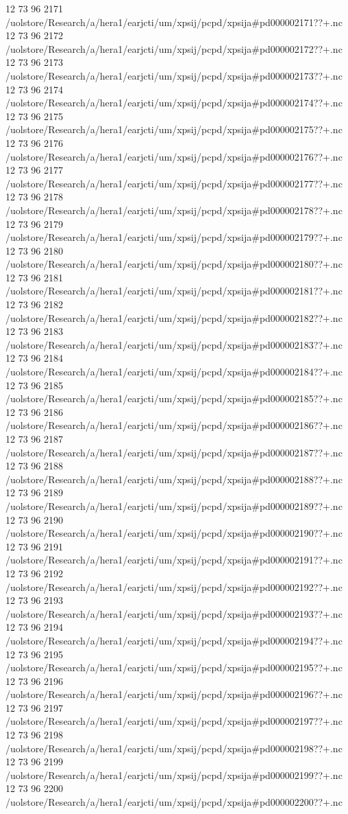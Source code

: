 12 73 96
2171
/uolstore/Research/a/hera1/earjcti/um/xpsij/pcpd/xpsija#pd000002171??+.nc
12 73 96
2172
/uolstore/Research/a/hera1/earjcti/um/xpsij/pcpd/xpsija#pd000002172??+.nc
12 73 96
2173
/uolstore/Research/a/hera1/earjcti/um/xpsij/pcpd/xpsija#pd000002173??+.nc
12 73 96
2174
/uolstore/Research/a/hera1/earjcti/um/xpsij/pcpd/xpsija#pd000002174??+.nc
12 73 96
2175
/uolstore/Research/a/hera1/earjcti/um/xpsij/pcpd/xpsija#pd000002175??+.nc
12 73 96
2176
/uolstore/Research/a/hera1/earjcti/um/xpsij/pcpd/xpsija#pd000002176??+.nc
12 73 96
2177
/uolstore/Research/a/hera1/earjcti/um/xpsij/pcpd/xpsija#pd000002177??+.nc
12 73 96
2178
/uolstore/Research/a/hera1/earjcti/um/xpsij/pcpd/xpsija#pd000002178??+.nc
12 73 96
2179
/uolstore/Research/a/hera1/earjcti/um/xpsij/pcpd/xpsija#pd000002179??+.nc
12 73 96
2180
/uolstore/Research/a/hera1/earjcti/um/xpsij/pcpd/xpsija#pd000002180??+.nc
12 73 96
2181
/uolstore/Research/a/hera1/earjcti/um/xpsij/pcpd/xpsija#pd000002181??+.nc
12 73 96
2182
/uolstore/Research/a/hera1/earjcti/um/xpsij/pcpd/xpsija#pd000002182??+.nc
12 73 96
2183
/uolstore/Research/a/hera1/earjcti/um/xpsij/pcpd/xpsija#pd000002183??+.nc
12 73 96
2184
/uolstore/Research/a/hera1/earjcti/um/xpsij/pcpd/xpsija#pd000002184??+.nc
12 73 96
2185
/uolstore/Research/a/hera1/earjcti/um/xpsij/pcpd/xpsija#pd000002185??+.nc
12 73 96
2186
/uolstore/Research/a/hera1/earjcti/um/xpsij/pcpd/xpsija#pd000002186??+.nc
12 73 96
2187
/uolstore/Research/a/hera1/earjcti/um/xpsij/pcpd/xpsija#pd000002187??+.nc
12 73 96
2188
/uolstore/Research/a/hera1/earjcti/um/xpsij/pcpd/xpsija#pd000002188??+.nc
12 73 96
2189
/uolstore/Research/a/hera1/earjcti/um/xpsij/pcpd/xpsija#pd000002189??+.nc
12 73 96
2190
/uolstore/Research/a/hera1/earjcti/um/xpsij/pcpd/xpsija#pd000002190??+.nc
12 73 96
2191
/uolstore/Research/a/hera1/earjcti/um/xpsij/pcpd/xpsija#pd000002191??+.nc
12 73 96
2192
/uolstore/Research/a/hera1/earjcti/um/xpsij/pcpd/xpsija#pd000002192??+.nc
12 73 96
2193
/uolstore/Research/a/hera1/earjcti/um/xpsij/pcpd/xpsija#pd000002193??+.nc
12 73 96
2194
/uolstore/Research/a/hera1/earjcti/um/xpsij/pcpd/xpsija#pd000002194??+.nc
12 73 96
2195
/uolstore/Research/a/hera1/earjcti/um/xpsij/pcpd/xpsija#pd000002195??+.nc
12 73 96
2196
/uolstore/Research/a/hera1/earjcti/um/xpsij/pcpd/xpsija#pd000002196??+.nc
12 73 96
2197
/uolstore/Research/a/hera1/earjcti/um/xpsij/pcpd/xpsija#pd000002197??+.nc
12 73 96
2198
/uolstore/Research/a/hera1/earjcti/um/xpsij/pcpd/xpsija#pd000002198??+.nc
12 73 96
2199
/uolstore/Research/a/hera1/earjcti/um/xpsij/pcpd/xpsija#pd000002199??+.nc
12 73 96
2200
/uolstore/Research/a/hera1/earjcti/um/xpsij/pcpd/xpsija#pd000002200??+.nc
